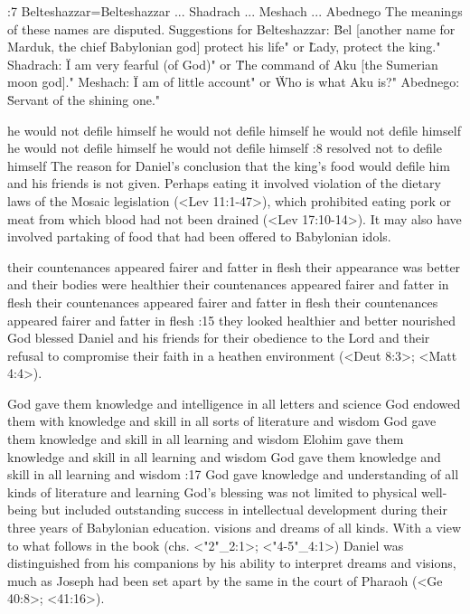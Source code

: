 :7 {Belteshazzar}={Belteshazzar ... Shadrach ...   Meshach ...  Abednego}
The meanings of these names are disputed. Suggestions for Belteshazzar:
 \"Bel [another name for Marduk, the chief Babylonian 
god] protect his life" or \"Lady, protect the king." Shadrach: \"I am 
very fearful (of God)" or \"The command of Aku [the Sumerian 
moon god]." Meshach: \"I am of little account" or \"Who is what 
Aku is?" Abednego: \"Servant of the shining one."


    {he would not defile himself} %
    {he would not defile himself} %
    {he would not defile himself} %
    {he would not defile himself} %
    {he would not defile himself} %
:8 {resolved not to defile himself} The reason for Daniel's conclusion that the king's food
would defile him and his friends is not  
given. Perhaps eating it involved violation of the dietary laws of the 
Mosaic legislation (<Lev 11:1-47>), which prohibited eating pork or 
meat from which blood had not been drained (<Lev 17:10-14>). It 
may also have involved partaking of food that had been offered to 
Babylonian idols.


    {their countenances appeared fairer and fatter in flesh} %
    {their appearance was better and their bodies were healthier} %
    {their countenances appeared fairer and fatter in flesh} %
    {their countenances appeared fairer and fatter in flesh} %
    {their countenances appeared fairer and fatter in flesh} %
:15 {they looked healthier and better nourished} 
God blessed Daniel and his friends for their obedience to the Lord and their refusal to
compromise their faith in a heathen environment (<Deut 8:3>; <Matt 4:4>).


    {God gave them knowledge and intelligence in all letters and science} %
    {God endowed them with knowledge and skill in all sorts of literature and wisdom} %
    {God gave them knowledge and skill in all learning and wisdom} %
    {Elohim gave them knowledge and skill in all learning and wisdom} %
    {God gave them knowledge and skill in all learning and wisdom} %
:17 {God gave knowledge and understanding of all kinds of literature and learning} God's
blessing was not limited to physical 
well-being but included outstanding success in intellectual development during their three years of
Babylonian education. visions and dreams of all kinds. With a view to what follows in the book
(chs. <"2"_2:1>; <"4-5"_4:1>) Daniel was distinguished from his companions by his ability to interpret dreams and
visions, much as Joseph had been set apart by the same in the court of Pharaoh (<Ge 40:8>;
<41:16>).



